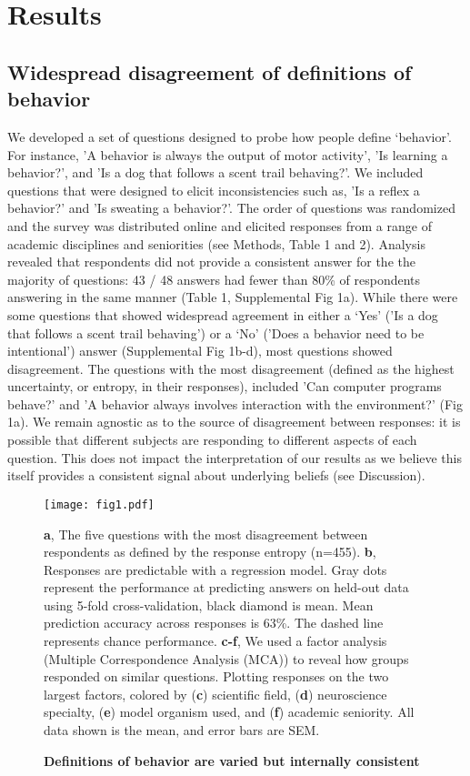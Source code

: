 \documentclass[a4paper, 11pt]{article}
\begin{document}
\section*{Results}

\subsection*{Widespread disagreement of definitions of behavior}
We developed a set of questions designed to probe how people define `behavior'. For instance, 'A behavior is always the output of motor activity', 'Is learning a behavior?', and 'Is a dog that follows a scent trail behaving?'. We included questions that were designed to elicit inconsistencies such as, 'Is a reflex a behavior?' and 'Is sweating a behavior?'. The order of questions was randomized and the survey was distributed online and elicited responses from a range of academic disciplines and seniorities (see Methods, Table 1 and 2). Analysis revealed that respondents did not provide a consistent answer for the the majority of questions: 43 / 48 answers had fewer than 80\% of respondents answering in the same manner (Table 1, Supplemental Fig 1a). While there were some questions that showed widespread agreement in either a `Yes' ('Is a dog that follows a scent trail behaving') or a `No' ('Does a behavior need to be intentional') answer (Supplemental Fig 1b-d), most questions showed disagreement. The questions with the most disagreement (defined as the highest uncertainty, or entropy, in their responses), included 'Can computer programs behave?' and 'A behavior always involves interaction with the environment?' (Fig 1a). We remain agnostic as to the source of disagreement between responses: it is possible that different subjects are responding to different aspects of each question. This does not impact the interpretation of our results as we believe this itself provides a consistent signal about underlying beliefs (see Discussion).

\begin{figure}
\centerline{\texttt{[image: fig1.pdf]}}
\caption{\textbf{Definitions of behavior are varied but internally consistent}} \textbf{a}, The five questions with the most disagreement between respondents as defined by the response entropy (n=455). \textbf{b}, Responses are predictable with a regression model. Gray dots represent the performance at predicting answers on held-out data using 5-fold cross-validation, black diamond is mean. Mean prediction accuracy across responses is 63\%. The dashed line represents chance performance. \textbf{c-f}, We used a factor analysis (Multiple Correspondence Analysis (MCA)) to reveal how groups responded on similar questions. Plotting responses on the two largest factors, colored by (\textbf{c}) scientific field, (\textbf{d}) neuroscience specialty, (\textbf{e}) model organism used, and (\textbf{f}) academic seniority. All data shown is the mean, and error bars are SEM.
\end{figure}
\end{document}
